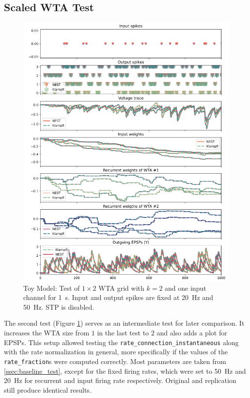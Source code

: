 \subsection{Scaled WTA Test}
\label{ssec:lateral_inhibition_test}
\begin{figure}[htbp]
    \centering
    \includegraphics[width=\columnwidth]{Figures/joint_tm_2wta2.png}
    \caption{Toy Model: Test of $1\times 2$ WTA grid with $k=2$ and one input channel for \SI{1}{\second}. Input and output spikes are fixed at \SI{20}{\hertz} and \SI{50}{\hertz}. STP is disabled.}
    \label{fig:joint_tm_2wta2}
\end{figure}
The second test (Figure \ref{fig:joint_tm_2wta2}) serves as an intermediate test for later comparison. It increases the WTA size from $1$ in the last test to $2$ and also adds a plot for EPSPs.
This setup allowed testing the \texttt{rate\_connection\_instantaneous} along with the rate normalization in general, more specifically if the values of the \texttt{rate\_fraction}s were computed correctly. Most parameters are taken from \ref{ssec:baseline_test}, except for the fixed firing rates, which were set to \SI{50}{\hertz} and \SI{20}{\hertz} for recurrent and input firing rate respectively. Original and replication still produce identical results. 

